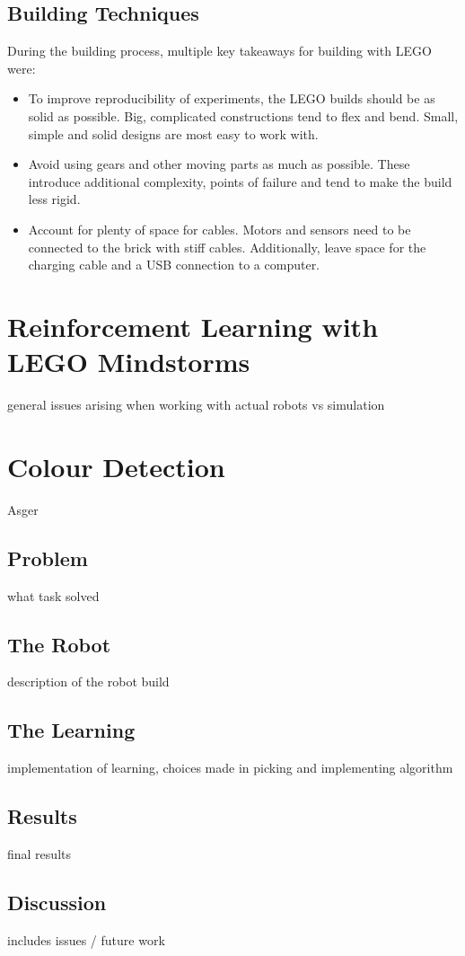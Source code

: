 \documentclass[11pt, a4paper]{article}
\begin{document}
\subsection{Building Techniques}
During the building process, multiple key takeaways for building with LEGO were:
\begin{itemize}
	\item To improve reproducibility of experiments, the LEGO builds should be as solid as possible. Big, complicated constructions tend to flex and bend. Small, simple and solid designs are most easy to work with.
	\item Avoid using gears and other moving parts as much as possible. These introduce additional complexity, points of failure and tend to make the build less rigid.
	\item Account for plenty of space for cables. Motors and sensors need to be connected to the brick with stiff cables. Additionally, leave space for the charging cable and a USB connection to a computer.
\end{itemize}


\section{Reinforcement Learning with LEGO Mindstorms}
general issues arising when working with actual robots vs simulation

\section{Colour Detection}
Asger
\subsection{Problem}
what task solved
\subsection{The Robot}
description of the robot build
\subsection{The Learning}
implementation of learning, choices made in picking and implementing algorithm
\subsection{Results}
final results
\subsection{Discussion}
includes issues / future work
\end{document}
